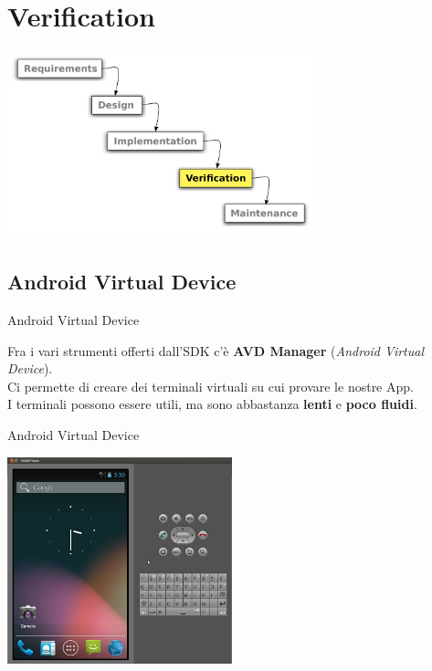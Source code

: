 \documentclass[xcolor=svgnames,11pt]{beamer}
\begin{document}
\section{Verification}

\begin{frame}
\begin{center}
\includegraphics[width=9cm]{waterfall_4.pdf}
\end{center}
\end{frame}

\subsection{Android Virtual Device}
\begin{frame}{Android Virtual Device}

	Fra i vari strumenti offerti dall'SDK c'\`e \textbf{AVD Manager} (\emph{Android Virtual Device}).\\
	\pause
	\medskip
	Ci permette di creare dei terminali virtuali su cui provare le nostre App.\\
	\pause
	\medskip
	I terminali possono essere utili, ma sono abbastanza \textbf{lenti} e \textbf{poco fluidi}.

\end{frame}
\begin{frame}{Android Virtual Device}

\begin{center}
\includegraphics[height=6cm]{avd.png}
\end{center}
\end{frame}
\end{document}
